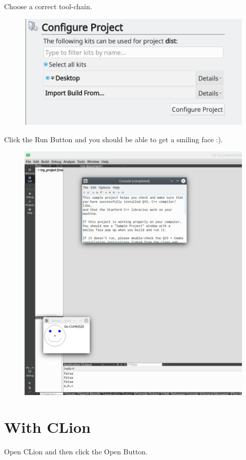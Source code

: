 \documentclass[a4paper,12pt]{report}
\begin{document}
Choose a correct tool-chain.

\begin{figure}[H] 
	\centering
	\includegraphics[width=\linewidth]{qt_creator3}
\end{figure}

Click the Run Button and you should be able to get a smiling face :).

\begin{figure}[H] 
	\centering
	\includegraphics[scale=0.4]{qt_creator4}
\end{figure}

\section{With CLion}
Open CLion and then click the Open Button.
\end{document}
